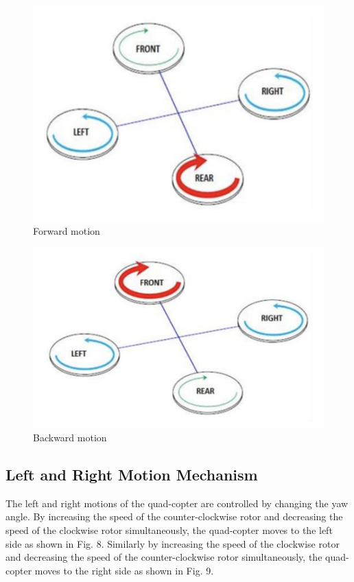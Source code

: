 \documentclass[a4paper,twoside]{iiththesis}
\begin{document}
\begin{figure}[h!]
\caption{Forward motion}
\label{Forward motion}
\centering
\includegraphics[width=\columnwidth]{./Figures/forward_motion_qc.png}
\end{figure}

\begin{figure}[h!]
\caption{Backward motion}
\label{Backward motion}
\centering
\includegraphics[width=\columnwidth]{./Figures/backward_motion_qc.png}
\end{figure}

\subsection{Left and Right Motion Mechanism}
\par The left and right motions of the quad-copter are controlled by changing the yaw angle. By increasing the speed of the counter-clockwise rotor and decreasing the speed of the clockwise rotor simultaneously, the quad-copter moves to the left side as shown in Fig. 8. Similarly by increasing the speed of the clockwise rotor and decreasing the speed of the counter-clockwise rotor simultaneously, the quad-copter moves to the right side as shown in Fig. 9.
\end{document}
